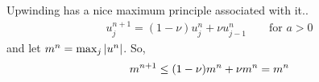 \documentclass{article}
\begin{document}
        Upwinding has a nice maximum principle associated with it..
        \begin{align*}
            u_j^{n+1} = (1 - \nu)u_j^n + \nu u_{j-1}^n \qquad \text{for $a > 0$}
        \end{align*}
        and let $m^n = \max_{j}\abs{u^n}$.  So,
        \begin{align*}
            m^{n+1} \leq \qty(1 - \nu)m^n + \nu m^n = m^n
        \end{align*}
\end{document}
